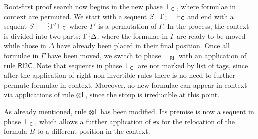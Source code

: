 \documentclass[submission,copyright,creativecommons]{eptcs}
\theoremstyle{definition}
\newcommand{\tl}{\otimes \mathsf{L}}
\newcommand{\C}{\mathsf{C}}
\newcommand{\RI}{\mathsf{RI}}
\newcommand{\ex}{\mathsf{ex}}
\newcommand{\spl}{\raisebox{-1.5pt}[0.5\height]{\hspace{1pt}\vdots\hspace{1pt}}}
\begin{document}
 Root-first proof search now begins in the new phase $\vdash_\C$, where formulae in context are permuted.
  We start with a sequent $S \mid \Gamma \spl \quad \vdash_{\C}$ and end with a sequent $S \mid \quad \spl \Gamma' \vdash_{\C}$ where $\Gamma'$ is a permutation of $\Gamma$.
  In the process, the context is divided into two parts: $\Gamma \spl \Delta$, where the formulae in $\Gamma$ are ready to be moved while those in $\Delta$ have already been placed in their final position.
  Once all formulae in $\Gamma$ have been moved, we switch to phase $\vdash_\RI$ with an application of rule $\RI 2 \C$. 
  Note that sequents in phase $\vdash_\C$ are not marked by list of tags, since after the application of right non-invertible rules there is no need to further permute formulae in context. Moreover, no new formulae can appear in context via applications of rule $\tl$, since the stoup is irreducible at this point.

  As already mentioned, rule $\tl$ has been modified. Its premise is now a sequent in phase $\vdash_\C$, which allows a further application of $\ex$ for the relocation of the formula $B$ to a different position in the context.
\end{document}
